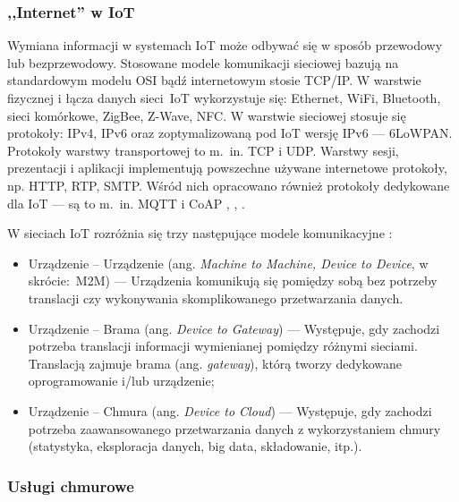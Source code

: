 \documentclass[a4paper, 12pt, twoside]{article}
\begin{document}
\subsubsection{,,Internet'' w IoT}

Wymiana informacji w systemach IoT może odbywać się w sposób przewodowy lub bezprzewodowy.
Stosowane modele komunikacji sieciowej bazują na standardowym modelu OSI bądź
internetowym stosie TCP/IP. W warstwie fizycznej i łącza danych
sieci~IoT wykorzystuje się: Ethernet, WiFi, Bluetooth, sieci komórkowe,
ZigBee, Z-Wave, NFC. W warstwie sieciowej stosuje się protokoły: IPv4, IPv6 oraz zoptymalizowaną
pod IoT wersję IPv6 --- 6LoWPAN. Protokoły warstwy transportowej to m.~in. TCP i UDP.
Warstwy sesji, prezentacji i aplikacji implementują powszechne używane internetowe protokoły, np.
HTTP, RTP, SMTP. Wśród nich opracowano również
protokoły dedykowane dla IoT --- są to m.~in. MQTT i CoAP \cite{internet-reczy}, \cite{intro-to-iot}, \cite{iot-hype-to-reality}.


W sieciach IoT rozróżnia się trzy następujące modele komunikacyjne \cite{intro-to-iot}:

\begin{itemize}
      \itemsep0em
      \item Urządzenie -- Urządzenie (ang. \emph{Machine to Machine, Device to Device}, w skrócie:~M2M)
            --- Urządzenia komunikują się pomiędzy sobą bez potrzeby translacji czy wykonywania
            skomplikowanego przetwarzania danych.
      \item Urządzenie -- Brama (ang. \emph{Device to Gateway})
            --- Występuje, gdy zachodzi potrzeba translacji informacji wymienianej pomiędzy różnymi sieciami.
            Translacją zajmuje brama (ang. \emph{gateway}), którą tworzy dedykowane oprogramowanie i/lub urządzenie;
      \item Urządzenie -- Chmura (ang. \emph{Device to Cloud})
            --- Występuje, gdy zachodzi potrzeba zaawansowanego przetwarzania danych
            z wykorzystaniem chmury (statystyka, eksploracja danych, big data, składowanie, itp.).
\end{itemize}

\subsubsection{Usługi chmurowe}
\end{document}
